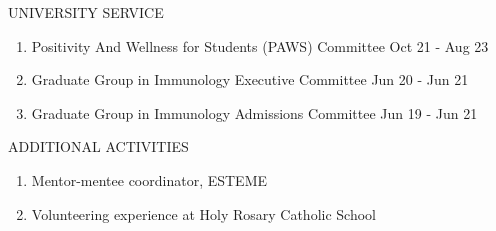 \documentclass{resume} %
\begin{document}


\begin{rSection}{UNIVERSITY SERVICE}
\begin{enumerate}

\item Positivity And Wellness for Students (PAWS) Committee
\hfill Oct 21 - Aug 23
\item Graduate Group in Immunology Executive Committee
\hfill Jun 20 - Jun 21
\item Graduate Group in Immunology Admissions Committee
\hfill Jun 19 - Jun 21

\end{enumerate}
\end{rSection}

\begin{rSection}{ADDITIONAL ACTIVITIES} \itemsep -3pt
\begin{enumerate}

\item Mentor-mentee coordinator, ESTEME
\item Volunteering experience at Holy Rosary Catholic School

\end{enumerate}
\end{rSection}
\end{document}
